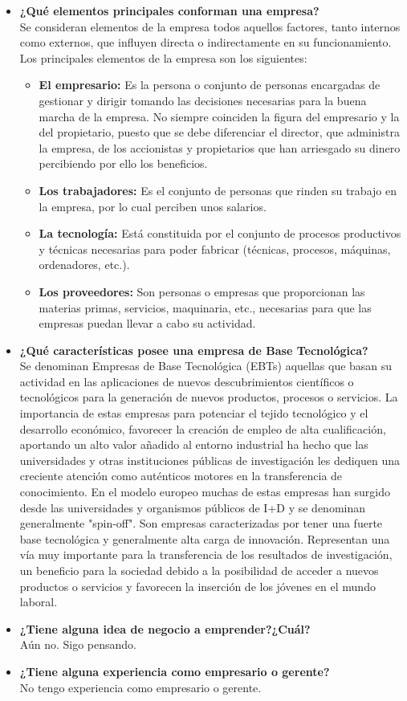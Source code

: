 \documentclass[a4paper,12pt]{article}
\begin{document}
\begin{itemize}
 \item \textbf{¿Qué elementos principales conforman una empresa?} \\
 Se consideran elementos de la empresa todos aquellos factores, tanto internos como externos, que influyen directa o indirectamente en su funcionamiento.
 Los principales elementos de la empresa son los siguientes:
 \begin{itemize}
    \item \textbf{El empresario:} Es la persona o conjunto de personas encargadas de gestionar y dirigir tomando las decisiones necesarias para la buena marcha de la empresa. No siempre coinciden la figura del empresario y la del propietario, puesto que se debe diferenciar el director, que administra la empresa, de los accionistas y propietarios que han arriesgado su dinero percibiendo por ello los beneficios.
    \item \textbf{Los trabajadores:} Es el conjunto de personas que rinden su trabajo en la empresa, por lo cual perciben unos salarios.
    \item \textbf{La tecnología:} Está constituida por el conjunto de procesos productivos y técnicas necesarias para poder fabricar (técnicas, procesos, máquinas, ordenadores, etc.).
    \item \textbf{Los proveedores:} Son personas o empresas que proporcionan las materias primas, servicios, maquinaria, etc., necesarias para que las empresas puedan llevar a cabo su actividad.
 \end{itemize}
 
 \item \textbf{¿Qué características posee una empresa de Base Tecnológica?} \\
 Se denominan Empresas de Base Tecnológica (EBTs) aquellas que basan su actividad en las aplicaciones de nuevos descubrimientos científicos o tecnológicos para la generación de nuevos productos, procesos o servicios.
 La importancia de estas empresas para potenciar el tejido tecnológico y el desarrollo económico, favorecer la creación de empleo de alta cualificación, aportando un alto valor añadido al entorno industrial ha hecho que las universidades y otras instituciones públicas de investigación les dediquen una creciente atención como auténticos motores en la transferencia de conocimiento.
 En el modelo europeo muchas de estas empresas han surgido desde las universidades y organismos públicos de I+D y se denominan generalmente "spin-off". Son empresas caracterizadas por tener una fuerte base tecnológica y generalmente alta carga de innovación. Representan una vía muy importante para la transferencia de los resultados de investigación, un beneficio para la sociedad debido a la posibilidad de acceder a nuevos productos o servicios y favorecen la inserción de los jóvenes en el mundo laboral.
 
 \item \textbf{¿Tiene alguna idea de negocio a emprender?¿Cuál?} \\
 Aún no. Sigo pensando.
 
 \item \textbf{¿Tiene alguna experiencia como empresario o gerente?} \\
 No tengo experiencia como empresario o gerente.
 
\end{itemize}
\end{document}
